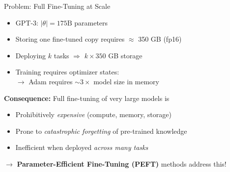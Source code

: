 \documentclass[11pt,compress,t,notes=noshow, xcolor=table]{beamer}
\begin{document}
\begin{frame}{Problem: Full Fine-Tuning at Scale}

\vfill

\begin{itemize}
  \item GPT-3: $|\theta| = 175\text{B}$ parameters
  \item Storing one fine-tuned copy requires $\approx$ 350 GB (fp16)
  \item Deploying $k$ tasks $\Rightarrow$ $k \times 350$ GB storage
  \item Training requires optimizer states: \\
	$\to$ Adam requires $\sim 3\times$ model size in memory
\end{itemize}

\vfill

\textbf{Consequence:} Full fine-tuning of very large models is
\begin{itemize}
  \item Prohibitively \textit{expensive} (compute, memory, storage)
  \item Prone to \textit{catastrophic forgetting} of pre-trained knowledge
  \item Inefficient when deployed \textit{across many tasks}
\end{itemize}

\vfill

$\to$ \textbf{Parameter-Efficient Fine-Tuning (PEFT)} methods address this!

\vfill

\end{frame}

\end{document}
